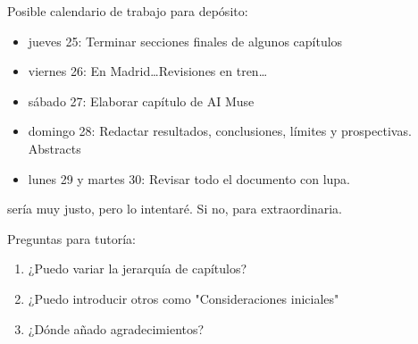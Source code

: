 Posible calendario de trabajo para depósito:
\begin{itemize}
  \item jueves 25: Terminar secciones finales de algunos capítulos
  \item viernes 26: En Madrid\dots Revisiones en tren\dots
  \item sábado 27: Elaborar capítulo de AI Muse
  \item domingo 28: Redactar resultados, conclusiones, límites y prospectivas. Abstracts
  \item lunes 29 y martes 30: Revisar todo el documento con lupa.
\end{itemize}
sería muy justo, pero lo intentaré. Si no, para extraordinaria.

Preguntas para tutoría:
\begin{enumerate}
  \item ¿Puedo variar la jerarquía de capítulos?
  \item ¿Puedo introducir otros como "Consideraciones iniciales"
  \item ¿Dónde añado agradecimientos?
\end{enumerate}
\clearpage
\nopagecolor

